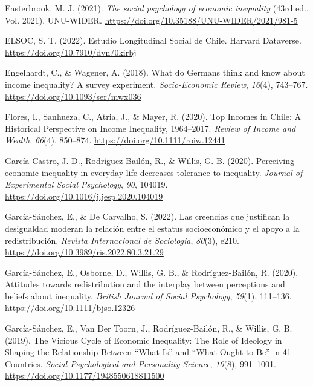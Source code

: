 \documentclass[
  12pt,
]{article}
\newlength{\cslhangindent}
\newenvironment{CSLReferences}[2] %
 {\begin{list}{}{%
  \setlength{\itemindent}{0pt}
  \setlength{\leftmargin}{0pt}
  \setlength{\parsep}{0pt}
  \ifodd #1
   \setlength{\leftmargin}{\cslhangindent}
   \setlength{\itemindent}{-1\cslhangindent}
  \fi
  \setlength{\itemsep}{#2\baselineskip}}}
 {\end{list}}
\begin{document}
\begin{CSLReferences}{1}{0}
Easterbrook, M. J. (2021). \emph{The social psychology of economic
inequality} (43rd ed., Vol. 2021). UNU-WIDER.
\url{https://doi.org/10.35188/UNU-WIDER/2021/981-5}

ELSOC, S. T. (2022). Estudio {Longitudinal Social} de {Chile}. Harvard
Dataverse. \url{https://doi.org/10.7910/dvn/0kirbj}

Engelhardt, C., \& Wagener, A. (2018). What do {Germans} think and know
about income inequality? {A} survey experiment. \emph{Socio-Economic
Review}, \emph{16}(4), 743--767.
\url{https://doi.org/10.1093/ser/mwx036}

Flores, I., Sanhueza, C., Atria, J., \& Mayer, R. (2020). Top {Incomes}
in {Chile}: {A Historical Perspective} on {Income Inequality},
1964--2017. \emph{Review of Income and Wealth}, \emph{66}(4), 850--874.
\url{https://doi.org/10.1111/roiw.12441}

García-Castro, J. D., Rodríguez-Bailón, R., \& Willis, G. B. (2020).
Perceiving economic inequality in everyday life decreases tolerance to
inequality. \emph{Journal of Experimental Social Psychology}, \emph{90},
104019. \url{https://doi.org/10.1016/j.jesp.2020.104019}

García-Sánchez, E., \& De Carvalho, S. (2022). Las creencias que
justifican la desigualdad moderan la relaci{ó}n entre el estatus
socioecon{ó}mico y el apoyo a la redistribuci{ó}n. \emph{Revista
Internacional de Sociolog{í}a}, \emph{80}(3), e210.
\url{https://doi.org/10.3989/ris.2022.80.3.21.29}

García-Sánchez, E., Osborne, D., Willis, G. B., \& Rodríguez-Bailón, R.
(2020). Attitudes towards redistribution and the interplay between
perceptions and beliefs about inequality. \emph{British Journal of
Social Psychology}, \emph{59}(1), 111--136.
\url{https://doi.org/10.1111/bjso.12326}

García-Sánchez, E., Van Der Toorn, J., Rodríguez-Bailón, R., \& Willis,
G. B. (2019). The {Vicious Cycle} of {Economic Inequality}: {The Role}
of {Ideology} in {Shaping} the {Relationship Between} {``{What Is}''}
and {``{What Ought} to {Be}''} in 41 {Countries}. \emph{Social
Psychological and Personality Science}, \emph{10}(8), 991--1001.
\url{https://doi.org/10.1177/1948550618811500}


\end{CSLReferences}
\end{document}
